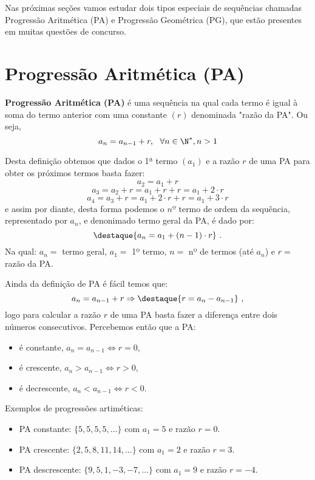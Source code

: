  Nas próximas seções vamos estudar dois tipos especiais de sequências chamadas Progressão Aritmética (PA) e Progressão Geométrica (PG), que estão presentes em muitas questões de concurso.

\section{Progressão Aritmética (PA)}

 \colorbox{azul}{
 \begin{minipage}{14.5cm}
 \begin{center}
  \textbf{Progressão Aritmética (PA)} é uma sequência na qual cada termo é igual à soma do termo anterior com uma constante $(r)$ denominada "razão da PA". Ou seja,
  \[a_{n}= a_{n-1} + r, \ \ \forall n \in \N^{\ast}, n > 1\]
 \end{center}
 \end{minipage}}
 \vskip0.3cm

 Desta definição obtemos que dados o 1ª termo $(a_1)$ e a razão $r$ de uma PA para obter os próximos termos basta fazer:
 \[a_2= a_1 + r\]
 \[a_3= a_2 + r= a_1 + r + r= a_1 + 2 \cdot r\]
 \[a_4= a_3 + r= a_1 + 2 \cdot r + r= a_1 + 3 \cdot r\]
 e assim por diante, desta forma podemos o $nº$ termo de ordem da sequência, representado por $a_n$, e denonimado termo geral da PA, é dado por:
 \[\destaque{a_n= a_1 + (n-1) \cdot r} \ .\]
 Na qual: $a_n=$ termo geral, $a_1=$ 1º termo, $n=$ nº de termos (até $a_n$) e $r=$ razão da PA.

 Ainda da definição de PA é fácil temos que:
 \[a_{n}= a_{n-1} + r \Rightarrow
 \destaque{r= a_{n} - a_{n-1}} \ ,\]
 logo para calcular a razão $r$ de uma PA basta fazer a diferença entre dois números consecutivos. Percebemos então que a PA:
 \begin{itemize}
  \item é constante, $a_n= a_{n-1} \Leftrightarrow r= 0$,
  \item é crescente, $a_n > a_{n-1} \Leftrightarrow r > 0$,
  \item é decrescente, $a_n < a_{n-1} \Leftrightarrow r < 0$.
 \end{itemize}

 \begin{exem} Exemplos de progressões artiméticas:
  \begin{itemize}
   \item PA constante: $\{5, 5, 5, 5, \ldots \}$ com $a_1= 5$ e razão $r= 0$.
   \item PA crescente: $\{2, 5, 8, 11, 14, \ldots \}$ com $a_1= 2$ e razão $r= 3$.
   \item PA descrescente: $\{9, 5, 1, -3, -7, \ldots \}$ com $a_1= 9$ e razão $r= -4$.
  \end{itemize}
 \end{exem}

